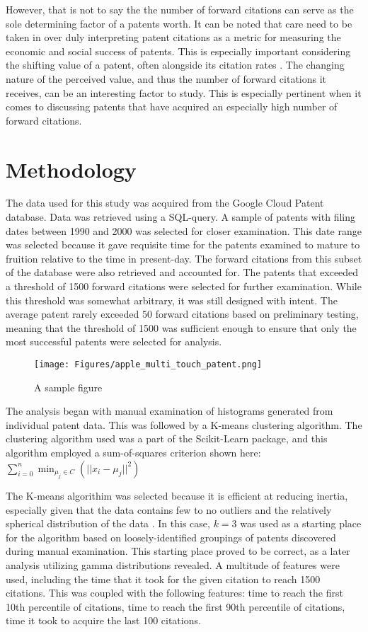However, that is not to say the the number of forward citations can serve as the sole determining factor of a patents worth. It can be noted that care need to be taken in over duly interpreting patent citations as a metric for measuring the economic and social success of patents. This is especially important considering the shifting value of a patent, often alongside its citation rates \citep{MARCO2007290}. The changing nature of the perceived value, and thus the number of forward citations it receives, can be an interesting factor to study. This is especially pertinent when it comes to discussing patents that have acquired an especially high number of forward citations. 




\section{Methodology}

The data used for this study was acquired from the Google Cloud Patent database. Data was retrieved using a SQL-query. A sample of patents with filing dates between 1990 and 2000 was selected for closer examination. This date range was selected because it gave requisite time for the patents examined to mature to fruition relative to the time in present-day. The forward citations from this subset of the database were also retrieved and accounted for. The patents that exceeded a threshold of 1500 forward citations were selected for further examination. While this threshold was somewhat arbitrary, it was still designed with intent. The average patent rarely exceeded 50 forward citations based on preliminary testing, meaning that the threshold of 1500 was sufficient enough to ensure that only the most successful patents were selected for analysis. 


\begin{figure}[H]
    \centering
    \texttt{[image: Figures/apple\_multi\_touch\_patent.png]}
    \caption{A sample figure}
    \label{fig:my_first_figure}
\end{figure}
The analysis began with manual examination of histograms generated from individual patent data. This was followed by a K-means clustering algorithm. The clustering algorithm used was a part of the Scikit-Learn package, and this algorithm employed a sum-of-squares criterion shown here: \(\sum_{i=0}^{n}\min_{\mu_j \in C}(||x_i - \mu_j||^2)\) 

The K-means algorithim was selected because it is efficient at reducing inertia, especially given that the data contains few to no outliers and the relatively spherical distribution of the data \citep{scikit-learn}. 
In this case, \(k = 3\) was used as a starting place for the algorithm based on loosely-identified groupings of patents discovered during manual examination. This starting place proved to be correct, as a later analysis utilizing gamma distributions revealed. A multitude of features were used, including the time that it took for the given citation to reach 1500 citations. This was coupled with the following features: time to reach the first 10th percentile of citations, time to reach the first 90th percentile of citations, time it took to acquire the last 100 citations. 

